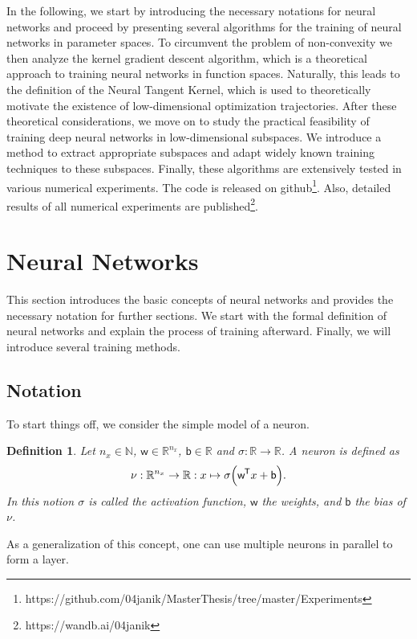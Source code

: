 \documentclass[11pt, a4paper]{article}
\newtheorem{definition}[theorem]{Definition}
\newcommand{\N}{\mathbb{N}}
\newcommand{\R}{\mathbb{R}}
\renewcommand{\b}{\mathsf{b}}
\newcommand{\w}{\mathsf{w}}
\newcommand*{\tr}{^{\mkern-1.5mu\mathsf{T}}}
\begin{document}
In the following, we start by introducing the necessary notations for neural networks and proceed by presenting several algorithms for the training of neural networks in parameter spaces. To circumvent the problem of non-convexity we then analyze the kernel gradient descent algorithm, which is a theoretical approach to training neural networks in function spaces. Naturally, this leads to the definition of the Neural Tangent Kernel, which is used to theoretically motivate the existence of low-dimensional optimization trajectories. After these theoretical considerations, we move on to study the practical feasibility of training deep neural networks in low-dimensional subspaces. We introduce a method to extract appropriate subspaces and adapt widely known training techniques to these subspaces. Finally, these algorithms are extensively tested in various numerical experiments. The code is released on github\footnote{https://github.com/04janik/MasterThesis/tree/master/Experiments}. Also, detailed results of all numerical experiments are published\footnote{https://wandb.ai/04janik}.

\section{Neural Networks}

This section introduces the basic concepts of neural networks and provides the necessary notation for further sections. We start with the formal definition of neural networks and explain the process of training afterward. Finally, we will introduce several training methods.

\subsection{Notation} \label{sec:notation}

To start things off, we consider the simple model of a neuron. 

\begin{definition}
Let $n_x \in \N$, $\w \in \R^{n_x}$, $\b \in \R$ and $\sigma: \R \to \R$. A neuron is defined as
\[ \nu : \R^{n_x} \to \R : x \mapsto \sigma \Big ( \w \tr x + \b \Big ).\] %
In this notion $\sigma$ is called the activation function, $\w$ the weights, and $\b$ the bias of $\nu$.
\end{definition}

As a generalization of this concept, one can use multiple neurons in parallel to form a layer.
\end{document}
